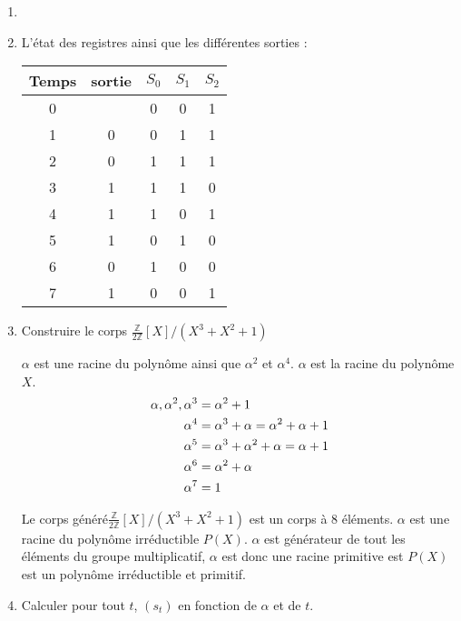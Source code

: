 \documentclass[a4paper,10pt]{article}
\newcommand{\Z}{\mathbb{Z}}
\begin{document}
\begin{enumerate}
\item \item
L'état des registres ainsi que les différentes sorties :


\begin{table}[h]
		\centering
		\begin{tabular}{|c|c|c|c|c|}
			\hline
			\rowcolor[HTML]{EFEFEF} \hline
			\cellcolor[HTML]{EFEFEF}\textbf{Temps}  & \cellcolor[HTML]{EFEFEF}\textbf{sortie} & \cellcolor[HTML]{EFEFEF}\textbf{$ S_{0} $} & \cellcolor[HTML]{EFEFEF}\textbf{$ S_{1} $} & \cellcolor[HTML]{EFEFEF}\textbf{$ S_{2} $} \\ \hline
			0 &   & 0 & 0 & 1 \\ \hline
			1 & 0 & 0 & 1 & 1 \\ \hline
			2 & 0 & 1 & 1 & 1 \\ \hline
			3 & 1 & 1 & 1 & 0 \\ \hline
			4 & 1 & 1 & 0 & 1 \\ \hline
			5 & 1 & 0 & 1 & 0 \\ \hline
			6 & 0 & 1 & 0 & 0 \\ \hline
			7 & 1 & 0 & 0 & 1 \\ \hline
		\end{tabular}
	\end{table}

\item
Construire le corps $\frac{\Z}{2\Z}[X]/(X^3+X^2+1)$

$\alpha $ est une racine du polynôme ainsi que $\alpha^2$ et $\alpha^4$.
$\alpha $ est la racine du polynôme $X$.
\begin{align}
	\alpha, \alpha^2, \alpha^3 &= \alpha^2+1 \notag \\
	\alpha^4 &= \alpha^3+\alpha=\alpha^2+\alpha+1 \notag \\
	\alpha^5 &= \alpha^3+\alpha^2+\alpha=\alpha+1 \notag \\
	\alpha^6 &= \alpha^2+\alpha \notag \\
	\alpha^7 &= 1 \notag
\end{align}


Le corps généré$\frac{\Z}{2\Z}[X]/(X^3+X^2+1)$ est un corps à 8 éléments. $\alpha $ est une racine du polynôme irréductible $P(X)$. $\alpha$ est générateur de tout les éléments du groupe multiplicatif,  $\alpha$ est donc une racine primitive est $P(X)$ est un polynôme irréductible et primitif.

\item
Calculer pour tout $t$, $(s_t)$ en fonction de $\alpha$ et de $t$.


\end{enumerate}
\end{document}
